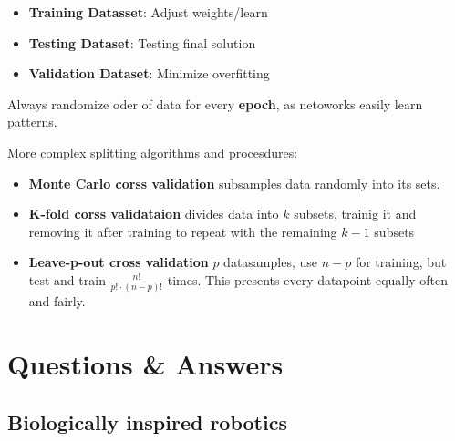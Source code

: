 \documentclass[
    fontsize      = 11pt,
    paper         = a4,
    twoside       = false,
    parskip       = half,
    pagesize      = false,
]{scrartcl}
\providecommand{\tightlist}{%
  \setlength{\itemsep}{0pt}\setlength{\parskip}{0pt}}
\begin{document}
\begin{itemize}
\tightlist
\item
  \textbf{Training Datasset}: Adjust weights/learn
\item
  \textbf{Testing Dataset}: Testing final solution
\item
  \textbf{Validation Dataset}: Minimize overfitting
\end{itemize}

Always randomize oder of data for every \textbf{epoch}, as netoworks
easily learn patterns.

More complex splitting algorithms and procesdures:

\begin{itemize}
\tightlist
\item
  \textbf{Monte Carlo corss validation} subsamples data randomly into
  its sets.
\item
  \textbf{K-fold corss validataion} divides data into \(k\) subsets,
  trainig it and removing it after training to repeat with the remaining
  \(k-1\) subsets
\item
  \textbf{Leave-p-out cross validation} \(p\) datasamples, use \(n-p\)
  for training, but test and train \(\frac{n!}{p!\cdot (n-p)!}\) times.
  This presents every datapoint equally often and fairly.
\end{itemize}

\clearpage
\newpage

\hypertarget{questions-answers}{%
\section{Questions \& Answers}\label{questions-answers}}

\hypertarget{biologically-inspired-robotics}{%
\subsection{Biologically inspired
robotics}\label{biologically-inspired-robotics}}
\end{document}
